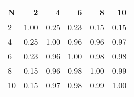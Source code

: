 \begin{tabular}{lrrrrr}
\toprule
N &    2  &    4  &    6  &    8  &    10 \\
\midrule
2  &  1.00 &  0.25 &  0.23 &  0.15 &  0.15 \\
4  &  0.25 &  1.00 &  0.96 &  0.96 &  0.97 \\
6  &  0.23 &  0.96 &  1.00 &  0.98 &  0.98 \\
8  &  0.15 &  0.96 &  0.98 &  1.00 &  0.99 \\
10 &  0.15 &  0.97 &  0.98 &  0.99 &  1.00 \\
\bottomrule
\end{tabular}
